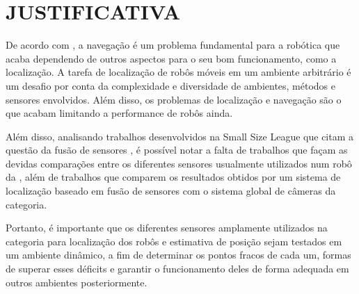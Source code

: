 \documentclass[acronym, symbols, table]{fei}
\begin{document}
%		
%		
%		
		
	\section{JUSTIFICATIVA}
	
		De acordo com \textcite{alatise2020review}, a navegação é um problema fundamental para a robótica que acaba dependendo de outros aspectos para o seu bom funcionamento, como a localização. A tarefa de localização de robôs móveis em um ambiente arbitrário é um desafio por conta da complexidade e diversidade de ambientes, métodos e sensores envolvidos. Além disso, os problemas de localização e navegação são o que acabam limitando a performance de robôs ainda.
		
		Além disso, analisando trabalhos desenvolvidos na Small Size League que citam a questão da fusão de sensores \cite{Ryll2013TIGERSM, ubc_thunderbots_2017, parsian_2015, parsian_2019, mrl_2020, ubc_thunderbots_2015, immortals_2023}, é possível notar a falta de trabalhos que façam as devidas comparações entre os diferentes sensores usualmente utilizados num robô da , além de trabalhos que comparem os resultados obtidos por um sistema de localização baseado em fusão de sensores com o sistema global de câmeras da categoria.
		
		Portanto, é importante que os diferentes sensores amplamente utilizados na categoria  para localização dos robôs e estimativa de posição sejam testados em um ambiente dinâmico, a fim de determinar os pontos fracos de cada um, formas de superar esses déficits e garantir o funcionamento deles de forma adequada em outros ambientes posteriormente.
	
\end{document}
